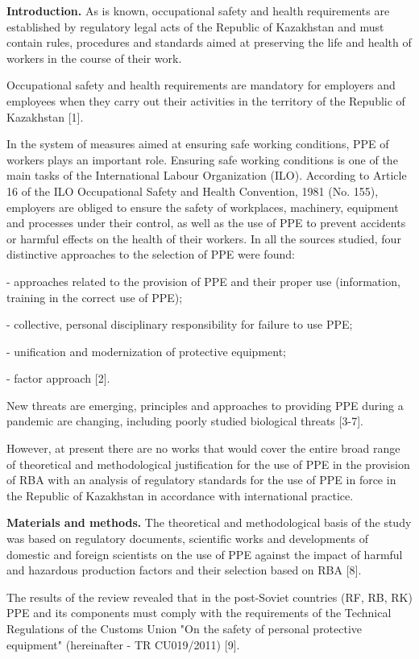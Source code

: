{{\bfseries Introduction.} As is known, occupational safety and health
requirements are established by regulatory legal acts of the Republic of
Kazakhstan and must contain rules, procedures and standards aimed at
preserving the life and health of workers in the course of their work.

Occupational safety and health requirements are mandatory for employers
and employees when they carry out their activities in the territory of
the Republic of Kazakhstan {[}1{]}.

In the system of measures aimed at ensuring safe working conditions, PPE
of workers plays an important role. Ensuring safe working conditions is
one of the main tasks of the International Labour Organization (ILO).
According to Article 16 of the ILO Occupational Safety and Health
Convention, 1981 (No. 155), employers are obliged to ensure the safety
of workplaces, machinery, equipment and processes under their control,
as well as the use of PPE to prevent accidents or harmful effects on the
health of their workers. In all the sources studied, four distinctive
approaches to the selection of PPE were found:

- approaches related to the provision of PPE and their proper use
(information, training in the correct use of PPE);

- collective, personal disciplinary responsibility for failure to use
PPE;

- unification and modernization of protective equipment;

- factor approach {[}2{]}.

New threats are emerging, principles and approaches to providing PPE
during a pandemic are changing, including poorly studied biological
threats {[}3-7{]}.

However, at present there are no works that would cover the entire broad
range of theoretical and methodological justification for the use of PPE
in the provision of RBA with an analysis of regulatory standards for the
use of PPE in force in the Republic of Kazakhstan in accordance with
international practice.

{\bfseries Materials and methods.} The theoretical and methodological basis
of the study was based on regulatory documents, scientific works and
developments of domestic and foreign scientists on the use of PPE
against the impact of harmful and hazardous production factors and their
selection based on RBA {[}8{]}.

The results of the review revealed that in the post-Soviet countries
(RF, RB, RK) PPE and its components must comply with the requirements of
the Technical Regulations of the Customs Union "On the safety of
personal protective equipment" (hereinafter - TR CU019/2011) {[}9{]}.

}
